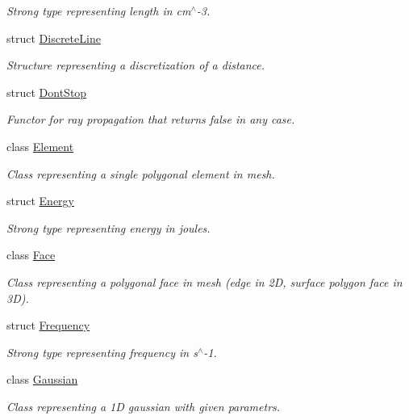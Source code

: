 \begin{DoxyCompactItemize}
\begin{DoxyCompactList}\small\item\em Strong type representing length in cm$^\wedge$-\/3. \end{DoxyCompactList}\item 
struct \hyperlink{structraytracer_1_1DiscreteLine}{Discrete\+Line}
\begin{DoxyCompactList}\small\item\em Structure representing a discretization of a distance. \end{DoxyCompactList}\item 
struct \hyperlink{structraytracer_1_1DontStop}{Dont\+Stop}
\begin{DoxyCompactList}\small\item\em Functor for ray propagation that returns false in any case. \end{DoxyCompactList}\item 
class \hyperlink{classraytracer_1_1Element}{Element}
\begin{DoxyCompactList}\small\item\em Class representing a single polygonal element in mesh. \end{DoxyCompactList}\item 
struct \hyperlink{structraytracer_1_1Energy}{Energy}
\begin{DoxyCompactList}\small\item\em Strong type representing energy in joules. \end{DoxyCompactList}\item 
class \hyperlink{classraytracer_1_1Face}{Face}
\begin{DoxyCompactList}\small\item\em Class representing a polygonal face in mesh (edge in 2D, surface polygon face in 3D). \end{DoxyCompactList}\item 
struct \hyperlink{structraytracer_1_1Frequency}{Frequency}
\begin{DoxyCompactList}\small\item\em Strong type representing frequency in s$^\wedge$-\/1. \end{DoxyCompactList}\item 
class \hyperlink{classraytracer_1_1Gaussian}{Gaussian}
\begin{DoxyCompactList}\small\item\em Class representing a 1D gaussian with given parametrs. \end{DoxyCompactList}\item 

\end{DoxyCompactItemize}
